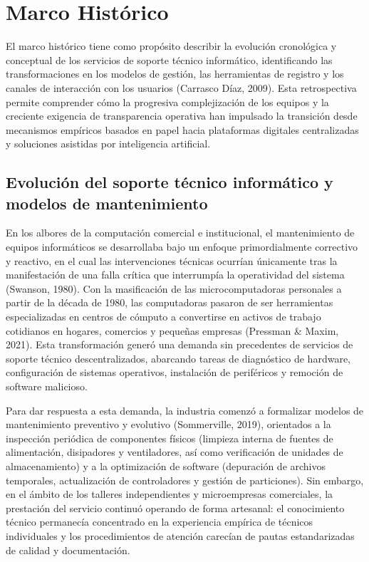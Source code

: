 \section{Marco Histórico}

El marco histórico tiene como propósito describir la evolución cronológica y conceptual de los servicios de soporte técnico informático, identificando las transformaciones en los modelos de gestión, las herramientas de registro y los canales de interacción con los usuarios (Carrasco Díaz, 2009). Esta retrospectiva permite comprender cómo la progresiva complejización de los equipos y la creciente exigencia de transparencia operativa han impulsado la transición desde mecanismos empíricos basados en papel hacia plataformas digitales centralizadas y soluciones asistidas por inteligencia artificial.

\subsection{Evolución del soporte técnico informático y modelos de mantenimiento}

En los albores de la computación comercial e institucional, el mantenimiento de equipos informáticos se desarrollaba bajo un enfoque primordialmente correctivo y reactivo, en el cual las intervenciones técnicas ocurrían únicamente tras la manifestación de una falla crítica que interrumpía la operatividad del sistema (Swanson, 1980). Con la masificación de las microcomputadoras personales a partir de la década de 1980, las computadoras pasaron de ser herramientas especializadas en centros de cómputo a convertirse en activos de trabajo cotidianos en hogares, comercios y pequeñas empresas (Pressman \& Maxim, 2021). Esta transformación generó una demanda sin precedentes de servicios de soporte técnico descentralizados, abarcando tareas de diagnóstico de hardware, configuración de sistemas operativos, instalación de periféricos y remoción de software malicioso.

Para dar respuesta a esta demanda, la industria comenzó a formalizar modelos de mantenimiento preventivo y evolutivo (Sommerville, 2019), orientados a la inspección periódica de componentes físicos (limpieza interna de fuentes de alimentación, disipadores y ventiladores, así como verificación de unidades de almacenamiento) y a la optimización de software (depuración de archivos temporales, actualización de controladores y gestión de particiones). Sin embargo, en el ámbito de los talleres independientes y microempresas comerciales, la prestación del servicio continuó operando de forma artesanal: el conocimiento técnico permanecía concentrado en la experiencia empírica de técnicos individuales y los procedimientos de atención carecían de pautas estandarizadas de calidad y documentación.

